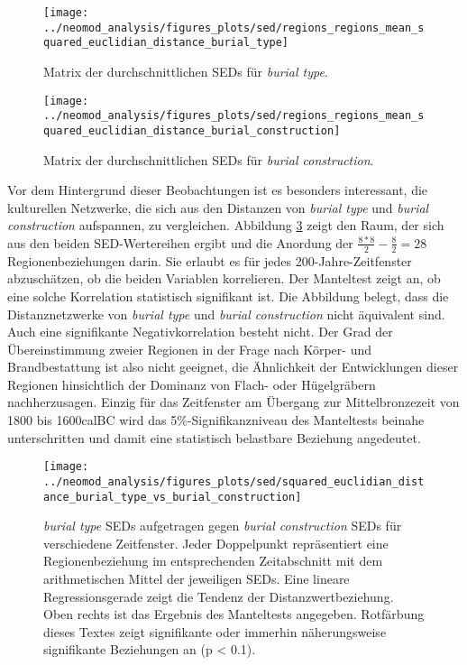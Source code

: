 \documentclass[openany,twoside,twocolumn]{book}
\begin{document}
\begin{figure}
\texttt{[image: ../neomod\_analysis/figures\_plots/sed/regions\_regions\_mean\_squared\_euclidian\_distance\_burial\_type]} \caption[Matrix der durchschnittlichen SEDs für \textit{burial type}]{Matrix der durchschnittlichen SEDs für \textit{burial type}.}\label{fig:sed-mean-matrix-bt}
\end{figure}

\begin{figure}
\texttt{[image: ../neomod\_analysis/figures\_plots/sed/regions\_regions\_mean\_squared\_euclidian\_distance\_burial\_construction]} \caption[Matrix der durchschnittlichen SEDs für \textit{burial construction}]{Matrix der durchschnittlichen SEDs für \textit{burial construction}.}\label{fig:sed-mean-matrix-bc}
\end{figure}

Vor dem Hintergrund dieser Beobachtungen ist es besonders interessant,
die kulturellen Netzwerke, die sich aus den Distanzen von \emph{burial
type} und \emph{burial construction} aufspannen, zu vergleichen.
Abbildung \ref{fig:mantel-bt-bc} zeigt den Raum, der sich aus den beiden
SED-Wertereihen ergibt und die Anordung der
\(\frac{8*8}{2}-\frac{8}{2}=28\) Regionenbeziehungen darin. Sie erlaubt
es für jedes 200-Jahre-Zeitfenster abzuschätzen, ob die beiden Variablen
korrelieren. Der Manteltest zeigt an, ob eine solche Korrelation
statistisch signifikant ist. Die Abbildung belegt, dass die
Distanznetzwerke von \emph{burial type} und \emph{burial construction}
nicht äquivalent sind. Auch eine signifikante Negativkorrelation besteht
nicht. Der Grad der Übereinstimmung zweier Regionen in der Frage nach
Körper- und Brandbestattung ist also nicht geeignet, die Ähnlichkeit der
Entwicklungen dieser Regionen hinsichtlich der Dominanz von Flach- oder
Hügelgräbern nachherzusagen. Einzig für das Zeitfenster am Übergang zur
Mittelbronzezeit von 1800 bis 1600calBC wird das 5\%-Signifikanzniveau
des Manteltests beinahe unterschritten und damit eine statistisch
belastbare Beziehung angedeutet.

\begin{landscape}
\begin{figure}
\texttt{[image: ../neomod\_analysis/figures\_plots/sed/squared\_euclidian\_distance\_burial\_type\_vs\_burial\_construction]} \caption[\textit{burial type} SEDs aufgetragen gegen \textit{burial construction} SEDs]{\textit{burial type} SEDs aufgetragen gegen \textit{burial construction} SEDs für verschiedene Zeitfenster. Jeder Doppelpunkt repräsentiert eine Regionenbeziehung im entsprechenden Zeitabschnitt mit dem arithmetischen Mittel der jeweiligen SEDs. Eine lineare Regressionsgerade zeigt die Tendenz der Distanzwertbeziehung. Oben rechts ist das Ergebnis des Manteltests angegeben. Rotfärbung dieses Textes zeigt signifikante oder immerhin näherungsweise signifikante Beziehungen an (p < 0.1).}\label{fig:mantel-bt-bc}
\end{figure}
\end{landscape}
\end{document}
